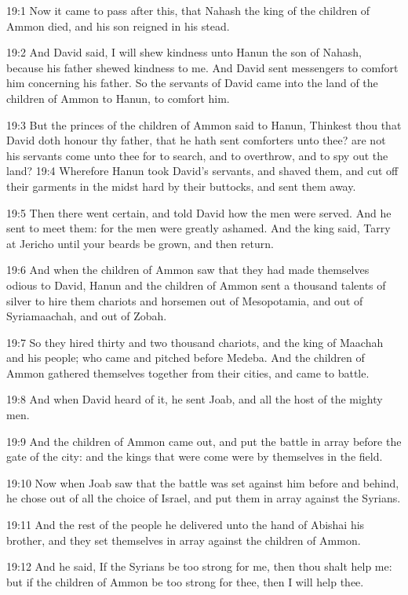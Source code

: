 19:1 Now it came to pass after this, that Nahash the king of the children of Ammon died, and his son reigned in his stead.

19:2 And David said, I will shew kindness unto Hanun the son of Nahash, because his father shewed kindness to me. And David sent messengers to comfort him concerning his father. So the servants of David came into the land of the children of Ammon to Hanun, to comfort him.

19:3 But the princes of the children of Ammon said to Hanun, Thinkest thou that David doth honour thy father, that he hath sent comforters unto thee?  are not his servants come unto thee for to search, and to overthrow, and to spy out the land?  19:4 Wherefore Hanun took David's servants, and shaved them, and cut off their garments in the midst hard by their buttocks, and sent them away.

19:5 Then there went certain, and told David how the men were served.  And he sent to meet them: for the men were greatly ashamed. And the king said, Tarry at Jericho until your beards be grown, and then return.

19:6 And when the children of Ammon saw that they had made themselves odious to David, Hanun and the children of Ammon sent a thousand talents of silver to hire them chariots and horsemen out of Mesopotamia, and out of Syriamaachah, and out of Zobah.

19:7 So they hired thirty and two thousand chariots, and the king of Maachah and his people; who came and pitched before Medeba. And the children of Ammon gathered themselves together from their cities, and came to battle.

19:8 And when David heard of it, he sent Joab, and all the host of the mighty men.

19:9 And the children of Ammon came out, and put the battle in array before the gate of the city: and the kings that were come were by themselves in the field.

19:10 Now when Joab saw that the battle was set against him before and behind, he chose out of all the choice of Israel, and put them in array against the Syrians.

19:11 And the rest of the people he delivered unto the hand of Abishai his brother, and they set themselves in array against the children of Ammon.

19:12 And he said, If the Syrians be too strong for me, then thou shalt help me: but if the children of Ammon be too strong for thee, then I will help thee.

